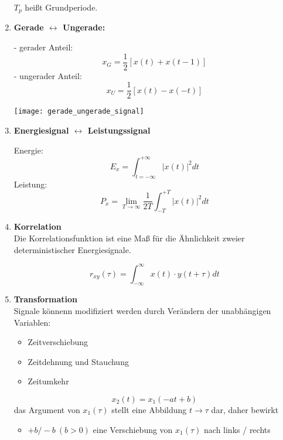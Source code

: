 \begin{enumerate}
\begin{mdframed}[style=exercise]
              $T_p$ hei{\ss}t Grundperiode.
          \end{mdframed}
      \item{\textbf{Gerade \hfill $\longleftrightarrow$ \hfill Ungerade:}}\\
          \begin{mdframed}[style=exercise,frametitle=Zerlegung des Signals:]
              - gerader Anteil: \[x_G=\frac{1}{2}\left[x(t)+x(t-1)\right]\]
              - ungerader Anteil: \[x_U=\frac{1}{2}\left[ x(t)-x(-t) \right]\]
          \end{mdframed}
          \begin{center}
              \texttt{[image: gerade\_ungerade\_signal]}
          \end{center}
      \item{\textbf{Energiesignal \hfill $\longleftrightarrow$ \hfill Leistungssignal}}
          \begin{mdframed}[style=exercise]
              Energie: \[E_x=\int_{t=-\infty}^{+\infty}\lvert x(t)\rvert^2 dt\]
              Leistung: \[P_x=\lim_{T\to\infty}\frac{1}{2T}\int_{-T}^{+T}\lvert x(t)\rvert^2 dt\]
          \end{mdframed}
      \item{\textbf{Korrelation}}\\
          Die Korrelationsfunktion ist eine Ma{\ss} f\"ur die \"Ahnlichkeit
          zweier deterministischer Energiesignale.
          \begin{mdframed}[style=exercise,frametitle=Korrelationsfunktion]
              \[
                  r_{xy}(\tau) = \int_{-\infty}^{\infty}x(t)\cdot y(t+\tau)dt
              \]
          \end{mdframed}
      \item{\textbf{Transformation}}\\
          Signale k\"onnenn modifiziert werden durch Ver\"andern der
          unabh\"angigen Variablen:
          \begin{itemize}
              \item Zeitverschiebung
              \item Zeitdehnung und Stauchung
              \item Zeitumkehr
          \end{itemize}
          \begin{mdframed}[style=exercise]
              \[
                  x_2(t) = x_1(-at+b)
              \]
          das Argument von $x_1(\tau)$ stellt eine Abbildung $t\rightarrow\tau$
          dar, daher bewirkt
          \begin{itemize}
              \item{$+b / -b\ (b > 0)$ eine Verschiebung von $x_1(\tau)$ nach links / rechts}


\end{itemize}
\end{mdframed}
\end{enumerate}
